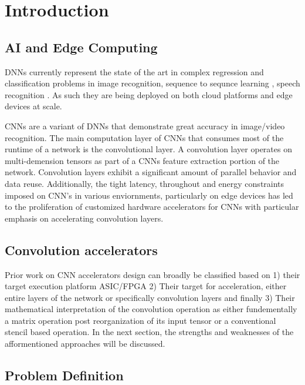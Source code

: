 
\chapter{Introduction}

\section{AI and Edge Computing}
\label{chap:intro:ai_and_edge}

\ac{DNN}s currently represent the state of the art in complex regression and
classification problems in image recognition, sequence to sequnce learning
\cite{dnn_is_sota_seq2seq}, speech recognition \cite{dnn_is_sota_speech}. As
such they are being deployed on both cloud platforms and edge devices at scale.

\ac{CNN}s are a variant of \ac{DNN}s that demonstrate great accuracy in
image/video recognition. The main computation layer of \ac{CNN}s that consumes
most of the runtime of a network is the convolutional layer. A convolution layer
operates on multi-demension tensors as part of a \ac{CNN}s feature extraction
portion of the network. Convolution layers exhibit a
significant amount of parallel behavior and data reuse. Additionally, the tight
latency, throughout and energy constraints imposed on CNN's in various
enviornments, particularly on edge devices has led to the proliferation of
customized hardware accelerators for \ac{CNN}s with particular emphasis on
accelerating convolution layers. 


\section{Convolution accelerators}
\label{chap:intro:cnn_accelerator_design_approaches}

Prior work on \ac{CNN} accelerators design can broadly be
classified based on 1) their target execution platform \ac{ASIC}/\ac{FPGA} 2)
Their target for acceleration, either entire layers of the network or
specifically convolution layers and finally 3) Their mathematical interpretation
of the convolution operation as either fundementally a matrix operation post
reorganization of its input tensor or a conventional stencil based operation. In
the next section, the strengths and weaknesses of the afformentioned approaches
will be discussed.

\section{Problem Definition}
\label{chap:intro:prob_def}

